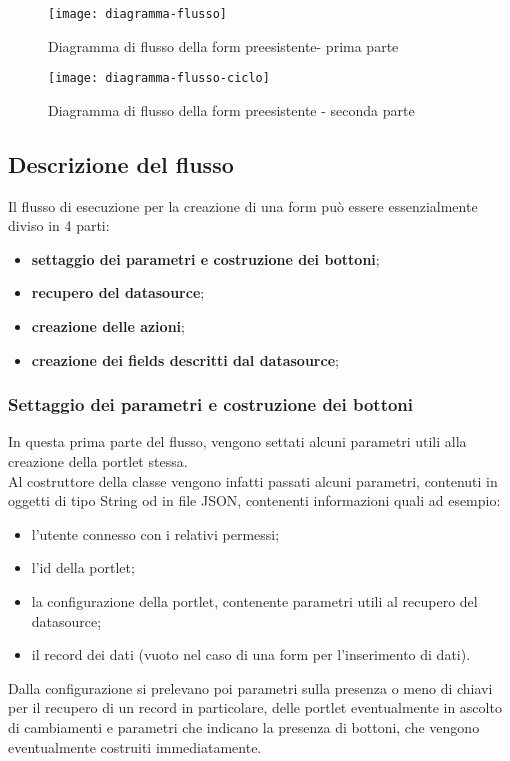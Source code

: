\begin{figure}[p]
	\centering
	\texttt{[image: diagramma-flusso]}
	\caption{Diagramma di flusso della form preesistente- prima parte}
	\label{form-portlet-flow-diagram-1}
\end{figure}

\begin{figure}[p]
	\centering
	\texttt{[image: diagramma-flusso-ciclo]}
	\caption{Diagramma di flusso della form preesistente - seconda parte}
	\label{form-portlet-flow-diagram-2}
\end{figure}

\subsection{Descrizione del flusso}
Il flusso di esecuzione per la creazione di una form può essere essenzialmente diviso in 4 parti: 
\begin{itemize}
	\item \textbf{settaggio dei parametri e costruzione dei bottoni};
	\item \textbf{recupero del datasource};
	\item \textbf{creazione delle azioni};
	\item \textbf{creazione dei fields descritti dal datasource};
\end{itemize}
\subsubsection{Settaggio dei parametri e costruzione dei bottoni}
In questa prima parte del flusso, vengono settati alcuni parametri utili alla creazione della portlet stessa.\\
Al costruttore della classe vengono infatti passati alcuni parametri, contenuti in oggetti di tipo String od in file JSON, contenenti informazioni quali ad esempio:
\begin{itemize}
	\item l'utente connesso con i relativi permessi;
	\item l'id della portlet;
	\item la configurazione della portlet, contenente parametri utili al recupero del datasource;
	\item il \gls{record} dei dati (vuoto nel caso di una form per l'inserimento di dati).
\end{itemize}
Dalla configurazione si prelevano poi parametri sulla presenza o meno di chiavi per il recupero di un \gls{record} in particolare, delle portlet eventualmente in ascolto di cambiamenti e parametri che indicano la presenza di bottoni, che vengono eventualmente costruiti immediatamente.\\
